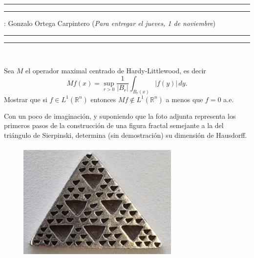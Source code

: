 \documentclass[11pt,a4paper]{article}
\begin{document}
\hrule\hrule
\vspace{2mm}


\vspace{3mm}

 : Gonzalo Ortega Carpintero \hfill ({\it Para entregar el jueves, 1 de noviembre})

\vspace{2mm}

\hrule\hrule 

\vspace{2mm}

\


\vskip 3mm

 Sea $M$ el operador maximal centrado de Hardy-Littlewood, es decir
$$
Mf(x)=\sup_{r>0} \frac 1{|B_r|}\int_{B_r(x)}|f(y)|\, dy.
$$
Mostrar que si $f\in L^1(\mathbb R^n)$ entonces $Mf\notin L^1(\mathbb R^n)$ a menos que $f=0$ a.e.
\vskip 2mm

\vskip 6mm

  Con un poco de imaginación, y suponiendo que la foto adjunta representa los primeros pasos de la construcción de una figura fractal semejante a la del triángulo de Sierpinski, determina (sin demostración) su dimensión de Hausdorff.
 \begin{figure}[h] 
   \includegraphics[width=80mm, height=60mm] {triangle.png}    
\end{figure}

 
 
 
 \vskip 6mm
\end{document}
